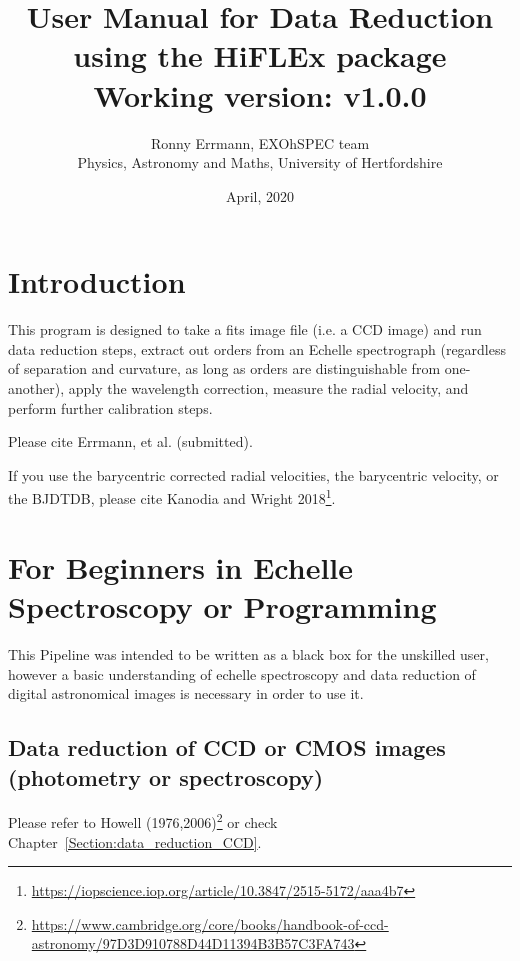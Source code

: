 \documentclass[10pt,a4paper]{article}
\title{User Manual for Data Reduction using the HiFLEx package\\ Working version: v1.0.0}
\date{April, 2020}
\author{Ronny Errmann, EXOhSPEC team\\ Physics, Astronomy and Maths, University of Hertfordshire}
\begin{document}
\maketitle

\tableofcontents
{}


\newpage


\section{Introduction}
\label{intro}

This program is designed to take a fits image file (i.e. a CCD image) and run data reduction steps, extract out orders from an Echelle spectrograph (regardless of separation and curvature, as long as orders are distinguishable from one-another), apply the wavelength correction, measure the radial velocity, and perform further calibration steps.

Please cite Errmann, et al. (submitted).

If you use the barycentric corrected radial velocities, the barycentric velocity, or the BJDTDB, please cite Kanodia and Wright 2018\footnote{\url{https://iopscience.iop.org/article/10.3847/2515-5172/aaa4b7}}.




\section{For Beginners in Echelle Spectroscopy or Programming}

This Pipeline was intended to be written as a black box for the unskilled user, however a basic understanding of echelle spectroscopy and data reduction of digital astronomical images is necessary in order to use it.


\subsection{Data reduction of CCD or CMOS images (photometry or spectroscopy)}
Please refer to Howell (1976,2006)\footnote{\url{https://www.cambridge.org/core/books/handbook-of-ccd-astronomy/97D3D910788D44D11394B3B57C3FA743}} or check Chapter~\ref{Section:data_reduction_CCD}.
\end{document}
